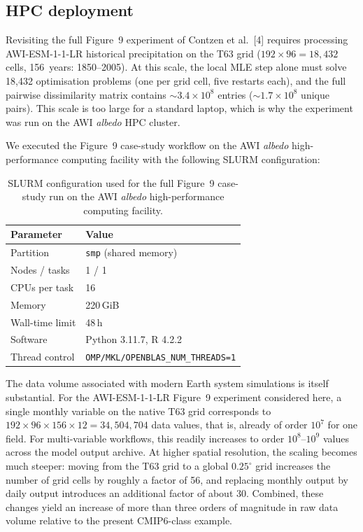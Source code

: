 \documentclass[preprint,12pt,a4paper]{elsarticle}
\newcommand{\rev}[1]{{#1}}
\newcommand{\revb}[1]{{\color{RevisionBlue}#1}}
\newcommand{\revg}[1]{{\color{RevisionGreen}#1}}
\newcommand{\revo}[1]{{\color{RevisionOrange}#1}}
\begin{document}
\rev{\subsection{HPC deployment}
\label{sec:hpc}

\revb{Revisiting} the full Figure~9 experiment of Contzen et al.~[4]
requires processing AWI-ESM-1-1-LR historical precipitation on the
T63 grid ($192 \times 96 = 18{,}432$ cells, 156~years: 1850--2005).
At this scale, the local MLE step alone must solve 18{,}432
optimisation problems (one per grid cell, five restarts each), and
the full pairwise dissimilarity matrix contains $\sim 3.4 \times
10^8$ entries ($\sim 1.7 \times 10^8$ unique pairs). \revo{This scale is too large for a standard laptop, which is why the
experiment was run on the AWI \emph{albedo} HPC cluster.}

We executed the Figure~9 \revb{case-study workflow} on the AWI \emph{albedo}
high-performance computing facility with the following SLURM
configuration:

\begin{table}[ht]
\centering
\begin{tabular}{ll}
\toprule
\textbf{Parameter} & \textbf{Value} \\
\midrule
Partition & \texttt{smp} (shared memory) \\
Nodes / tasks & 1 / 1 \\
CPUs per task & 16 \\
Memory & 220\,GiB \\
Wall-time limit & 48\,h \\
Software & Python 3.11.7, R 4.2.2 \\
Thread control & \texttt{OMP/MKL/OPENBLAS\_NUM\_THREADS=1} \\
\bottomrule
\end{tabular}
\caption{SLURM configuration used for the full Figure~9 \revb{case-study run}
  on the AWI \emph{albedo} high-performance computing facility.}
\label{tab:hpc-config}
\end{table}

\FloatBarrier

\revg{The data volume associated with modern Earth system
simulations is itself substantial. For the AWI-ESM-1-1-LR Figure~9
experiment considered here, a single monthly variable on the native
T63 grid corresponds to $192 \times 96 \times 156 \times 12 =
34{,}504{,}704$ data values, that is, already of order $10^7$ for one
field. For multi-variable workflows, this readily increases to order
$10^8$--$10^9$ values across the model output archive. At higher
spatial resolution, the scaling becomes much steeper: moving from the
T63 grid to a global $0.25^{\circ}$ grid increases the number of grid
cells by roughly a factor of 56, and replacing monthly output by daily
output introduces an additional factor of about 30. Combined, these
changes yield an increase of more than three orders of magnitude in
raw data volume relative to the present CMIP6-class example.}

}
\end{document}
